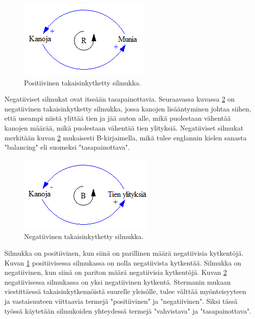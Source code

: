 \documentclass[finnish,12pt,a4paper,pdftex]{article}
\begin{document}
\begin{onehalfspacing}
\begin{figure}[H]
\centering \includegraphics{positiivinen}
\caption{Positiivinen takaisinkytketty silmukka. \cite[s. 13]{Sterman2000} \label{sysdyn:positiivinen}}
\end{figure}

Negatiiviset silmukat ovat itseään tasapainottavia. Seuraavassa kuvassa \ref{sysdyn:negatiivinen} on negatiivinen takaisinkytketty silmukka, jossa kanojen lisääntyminen johtaa siihen, että useampi niistä ylittää tien ja jää auton alle, mikä puolestaan vähentää kanojen määrää, mikä puolestaan vähentää tien ylityksiä. Negatiiviset silmukat merkitään kuvan \ref{sysdyn:negatiivinen} mukaisesti B-kirjaimella, mikä tulee englannin kielen sanasta "balancing" eli suomeksi "tasapainottava". \cite[s. 12--14]{Sterman2000}

\begin{figure}[H]
\centering \includegraphics{negatiivinen}
\caption{Negatiivinen takaisinkytketty silmukka. \cite[s. 13]{Sterman2000} \label{sysdyn:negatiivinen}}
\end{figure}

Silmukka on positiivinen, kun siinä on parillinen määrä negatiivisia kytkentöjä. Kuvan \ref{sysdyn:positiivinen} positiivisessa silmukassa on nolla negatiivista kytkentää. Silmukka on negatiivinen, kun siinä on pariton määrä negatiivisia kytkentöjä. Kuvan \ref{sysdyn:negatiivinen} negatiivisessa silmukassa on yksi negatiivinen kytkentä. \cite[s. 12--14]{Sterman2000} Stermanin mukaan \cite{Sterman2011} viestittäessä takaisinkytkennöistä suurelle yleisölle, tulee välttää myönteisyyteen ja vastaisuuteen viittaavia termejä "positiivinen" ja "negatiivinen". Siksi tässä työssä käytetään silmukoiden yhteydessä termejä "vahvistava" ja "tasapainottava". 


\end{onehalfspacing}
\end{document}
